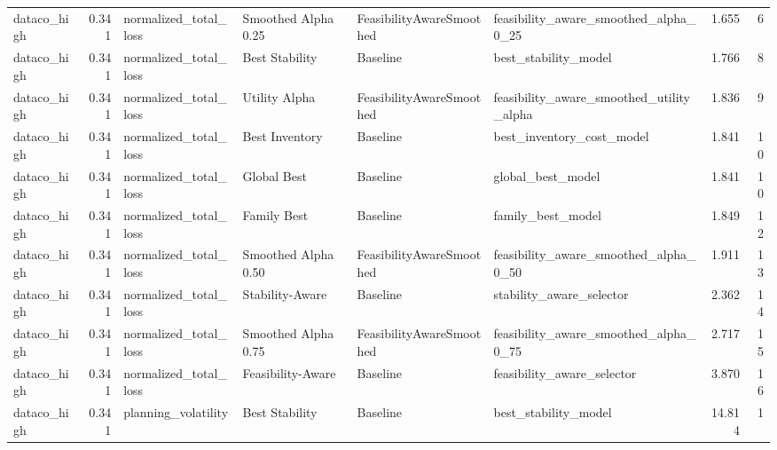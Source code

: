 \begin{table}
{\begin{tabular}{lrllllrr}
   dataco\_high &             0.341 &       normalized\_total\_loss &   Smoothed Alpha 0.25 &  FeasibilityAwareSmoothed &              feasibility\_aware\_smoothed\_alpha\_0\_25 &         1.655 &               6 \\
   dataco\_high &             0.341 &       normalized\_total\_loss &        Best Stability &                  Baseline &                               best\_stability\_model &         1.766 &               8 \\
   dataco\_high &             0.341 &       normalized\_total\_loss &         Utility Alpha &  FeasibilityAwareSmoothed &           feasibility\_aware\_smoothed\_utility\_alpha &         1.836 &               9 \\
   dataco\_high &             0.341 &       normalized\_total\_loss &        Best Inventory &                  Baseline &                          best\_inventory\_cost\_model &         1.841 &              10 \\
   dataco\_high &             0.341 &       normalized\_total\_loss &           Global Best &                  Baseline &                                  global\_best\_model &         1.841 &              10 \\
   dataco\_high &             0.341 &       normalized\_total\_loss &           Family Best &                  Baseline &                                  family\_best\_model &         1.849 &              12 \\
   dataco\_high &             0.341 &       normalized\_total\_loss &   Smoothed Alpha 0.50 &  FeasibilityAwareSmoothed &              feasibility\_aware\_smoothed\_alpha\_0\_50 &         1.911 &              13 \\
   dataco\_high &             0.341 &       normalized\_total\_loss &       Stability-Aware &                  Baseline &                           stability\_aware\_selector &         2.362 &              14 \\
   dataco\_high &             0.341 &       normalized\_total\_loss &   Smoothed Alpha 0.75 &  FeasibilityAwareSmoothed &              feasibility\_aware\_smoothed\_alpha\_0\_75 &         2.717 &              15 \\
   dataco\_high &             0.341 &       normalized\_total\_loss &     Feasibility-Aware &                  Baseline &                         feasibility\_aware\_selector &         3.870 &              16 \\
   dataco\_high &             0.341 &         planning\_volatility &        Best Stability &                  Baseline &                               best\_stability\_model &        14.814 &               1 \\

\end{tabular}}
\end{table}
